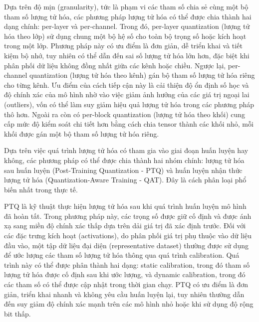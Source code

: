 Dựa trên độ mịn (granularity), tức là phạm vi các tham số chia sẻ cùng một bộ tham số lượng tử hóa, các phương pháp lượng tử hóa có thể được chia thành hai dạng chính: per-layer và per-channel. Trong đó, per-layer quantization (lượng tử hóa theo lớp) sử dụng chung một bộ hệ số cho toàn bộ trọng số hoặc kích hoạt trong một lớp. Phương pháp này có ưu điểm là đơn giản, dễ triển khai và tiết kiệm bộ nhớ, tuy nhiên có thể dẫn đến sai số lượng tử hóa lớn hơn, đặc biệt khi phân phối dữ liệu không đồng nhất giữa các kênh hoặc chiều. Ngược lại, per-channel quantization (lượng tử hóa theo kênh) gán bộ tham số lượng tử hóa riêng cho từng kênh. Ưu điểm của cách tiếp cận này là cải thiện độ ổn định số học và độ chính xác của mô hình nhờ vào việc giảm ảnh hưởng của các giá trị ngoại lai (outliers), vốn có thể làm suy giảm hiệu quả lượng tử hóa trong các phương pháp thô hơn. Ngoài ra còn có per-block quantization (lượng tử hóa theo khối) cung cấp mức độ kiểm soát chi tiết hơn bằng cách chia tensor thành các khối nhỏ, mỗi khối được gán một bộ tham số lượng tử hóa riêng. 

Dựa trên việc quá trình lượng tử hóa có tham gia vào giai đoạn huấn luyện hay không, các phương pháp có thể được chia thành hai nhóm chính: lượng tử hóa sau huấn luyện (Post-Training Quantization - PTQ) và huấn luyện nhận thức lượng tử hóa (Quantization-Aware Training - QAT). Đây là cách phân loại phổ biến nhất trong thực tế.

PTQ là kỹ thuật thực hiện lượng tử hóa sau khi quá trình huấn luyện mô hình đã hoàn tất. Trong phương pháp này, các trọng số được giữ cố định và được ánh xạ sang miền độ chính xác thấp dựa trên dải giá trị đã xác định trước. Đối với các đặc trưng kích hoạt (activations), do phân phối giá trị phụ thuộc vào dữ liệu đầu vào, một tập dữ liệu đại diện (representative dataset) thường được sử dụng để ước lượng các tham số lượng tử hóa thông qua quá trình calibration. Quá trình này có thể được phân thành hai dạng: static calibration, trong đó tham số lượng tử hóa được cố định sau khi ước lượng, và dynamic calibration, trong đó các tham số có thể được cập nhật trong thời gian chạy. PTQ có ưu điểm là đơn giản, triển khai nhanh và không yêu cầu huấn luyện lại, tuy nhiên thường dẫn đến suy giảm độ chính xác mạnh trên các mô hình nhỏ hoặc khi sử dụng độ rộng bit thấp.

